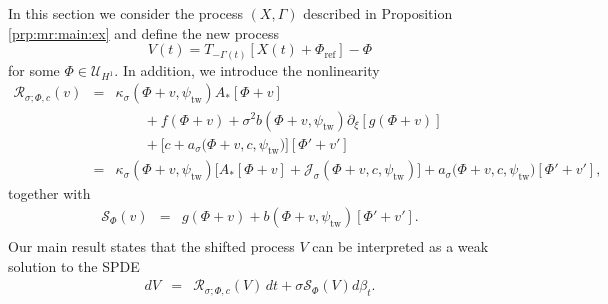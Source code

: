 \documentclass[10pt]{articleHJ}
\renewcommand{\b}{\ensuremath{\beta}}
\numberwithin{equation}{section}
\begin{document}
In this section we consider the process $(X, \Gamma)$
described in Proposition \ref{prp:mr:main:ex} and define
the new process
\begin{equation}
\label{eq:sps:def:V}
V(t) = T_{-\Gamma(t)} [ X(t) + \Phi_{\mathrm{ref}}]
  - \Phi
\end{equation}
for some $\Phi \in \mathcal{U}_{H^1}$.
In addition, we introduce the
nonlinearity
\begin{equation}
\begin{array}{lcl}
\mathcal{R}_{\sigma;\Phi, c}
(v)
& = &
 \kappa_{\sigma}(\Phi + v , \psi_{\mathrm{tw}} )
A_* [\Phi + v]
\\[0.2cm]
& & \qquad
 + f(\Phi + v)
+ \sigma^2  b(\Phi + v, \psi_{\mathrm{tw}} ) \partial_\xi[ g(\Phi + v) ]
\\[0.2cm]
& & \qquad
+ \Big[c + a_{\sigma}\big(\Phi + v , c , \psi_{\mathrm{tw}}
\big) \Big] [\Phi' + v']
\\[0.2cm]
& = &
 \kappa_{\sigma}(\Phi + v , \psi_{\mathrm{tw}} )
\Big[
A_* [\Phi + v]
+ \mathcal{J}_{\sigma}(\Phi + v,
c , \psi_{\mathrm{tw}} )
\Big]
+ a_{\sigma}\big(\Phi + v , c , \psi_{\mathrm{tw}}
\big) [\Phi' + v'] ,
\end{array}
\end{equation}
together with
\begin{equation}
\begin{array}{lcl}
\mathcal{S}_{\Phi}(v)
& = &
     g( \Phi + v )
     + b( \Phi + v , \psi_{\mathrm{tw}}) [\Phi' + v'].
\\[0.2cm]
\end{array}
\end{equation}
%
Our main result
states that the shifted process $V$ can be interpreted as a weak solution
to the SPDE
\begin{equation}
\begin{array}{lcl}
d V & = &
\mathcal{R}_{\sigma; \Phi, c}(V) \, dt
 + \sigma \mathcal{S}_{\Phi}(V) d\b_t .
\end{array}
\end{equation}
\end{document}
